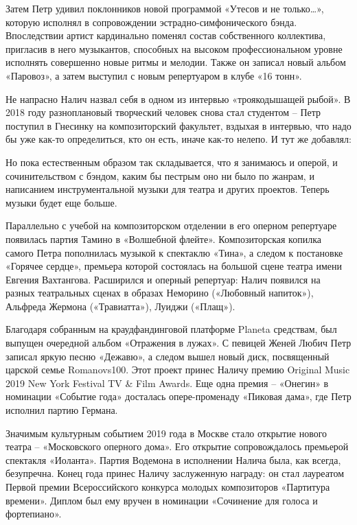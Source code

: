 Затем Петр удивил поклонников новой программой «Утесов и не только…», которую исполнял в сопровождении эстрадно-симфонического бэнда. Впоследствии артист кардинально поменял состав собственного коллектива, пригласив в него музыкантов, способных на высоком профессиональном уровне исполнять совершенно новые ритмы и мелодии. Также он записал новый альбом «Паровоз», а затем выступил с новым репертуаром в клубе «16 тонн».

Не напрасно Налич назвал себя в одном из интервью «троякодышащей рыбой». В 2018 году разноплановый творческий человек снова стал студентом – Петр поступил в Гнесинку на композиторский факультет, вздыхая в интервью, что надо бы уже как-то определиться, кто он есть, иначе как-то нелепо. И тут же добавлял:

\begin{fancyquotes}
    Но пока естественным образом так складывается, что я занимаюсь и оперой, и сочинительством с бэндом, каким бы пестрым оно ни было по жанрам, и написанием инструментальной музыки для театра и других проектов. Теперь музыки будет еще больше.
\end{fancyquotes}


Параллельно с учебой на композиторском отделении в его оперном репертуаре появилась партия Тамино в «Волшебной флейте». Композиторская копилка самого Петра пополнилась музыкой к спектаклю «Тина», а следом к постановке «Горячее сердце», премьера которой состоялась на большой сцене театра имени Евгения Вахтангова. Расширился и оперный репертуар: Налич появился на разных театральных сценах в образах Неморино («Любовный напиток»), Альфреда Жермона («Травиатта»), Луиджи («Плащ»).

Благодаря собранным на краудфандинговой платформе Planeta средствам, был выпущен очередной альбом «Отражения в лужах». С певицей Женей Любич Петр записал яркую песню «Дежавю», а следом вышел новый диск, посвященный царской семье Romanovs100. Этот проект принес Наличу премию Original Music 2019 New York Festival TV \& Film Awards. Еще одна премия – «Онегин» в номинации «Событие года» досталась опере-променаду «Пиковая дама», где Петр исполнил партию Германа.

Значимым культурным событием 2019 года в Москве стало открытие нового театра – «Московского оперного дома». Его открытие сопровождалось премьерой спектакля «Иоланта». Партия Водемона в исполнении Налича была, как всегда, безупречна. Конец года принес Наличу заслуженную награду: он стал лауреатом Первой премии Всероссийского конкурса молодых композиторов «Партитура времени». Диплом был ему вручен в номинации «Сочинение для голоса и фортепиано».



